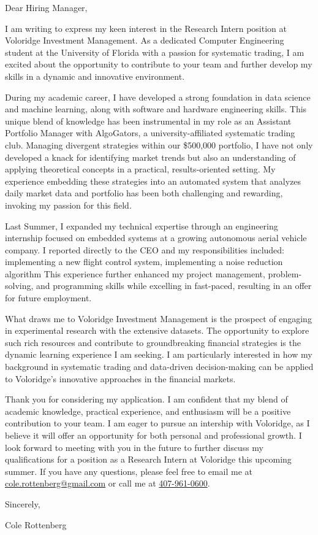 Dear Hiring Manager,

I am writing to express my keen interest in the Research Intern position at Voloridge Investment Management.
As a dedicated Computer Engineering student at the University of Florida with a passion for systematic trading, I am excited about the opportunity to contribute to your team and further develop my skills in a dynamic and innovative environment.

During my academic career, I have developed a strong foundation in data
science and machine learning, along with software and hardware engineering
skills.
This unique blend of knowledge has been instrumental in my role as an
Assistant Portfolio Manager with AlgoGators, a university-affiliated
systematic trading club.
Managing divergent strategies within our \$500,000 portfolio, I have not
only developed a knack for identifying
market trends but also an understanding of applying theoretical
concepts in a practical, results-oriented setting.
My experience embedding these strategies into an automated system that
analyzes daily market data and portfolio has been both challenging and rewarding,
invoking my passion for this field.

Last Summer, I expanded my technical expertise through an
engineering internship focused on embedded systems at a growing
autonomous aerial vehicle company. I reported directly to the CEO and my
responsibilities included:
implementing a new flight control system, implementing a noise reduction
algorithm
This experience further enhanced my project management, problem-solving,
and programming skills while excelling in fast-paced, resulting in an
offer for future employment.

What draws me to Voloridge Investment Management is the prospect of
engaging in experimental research with the extensive datasets.
The opportunity to explore such rich resources and contribute to
groundbreaking financial strategies is the dynamic learning experience I
am seeking. I am particularly interested in how my background in
systematic trading and data-driven decision-making can be applied to
Voloridge's innovative approaches in the financial markets.

Thank you for considering my application. I am confident that my blend
of academic knowledge, practical experience, and enthusiasm will be a
positive contribution to your team. I am eager to pursue an intership
with Voloridge, as I believe it will offer an opportunity for both
personal and professional growth. I look forward to meeting with you in
the future to further discuss my qualifications for a position as a
Research Intern at Voloridge this upcoming summer. If you have any
questions, please feel free to email me at
\href{mailto:cole.rottenberg@gmail.com}{cole.rottenberg@gmail.com}
or call me at \href{tel:+1-407-961-0600}{407-961-0600}.

Sincerely,
\vspace{-15pt}

Cole Rottenberg
